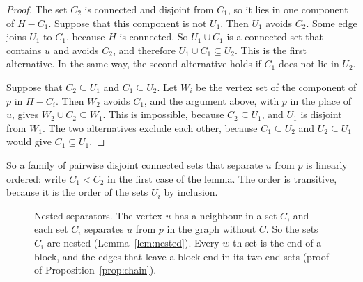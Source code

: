 \begin{proof}
The set $C_2$ is connected and disjoint from $C_1$, so it lies in one component of $H-C_1$.
Suppose that this component is not $U_1$. Then $U_1$ avoids $C_2$. Some edge joins $U_1$ to
$C_1$, because $H$ is connected. So $U_1\cup C_1$ is a connected set that contains $u$ and avoids
$C_2$, and therefore $U_1\cup C_1\subseteq U_2$. This is the first alternative. In the same way,
the second alternative holds if $C_1$ does not lie in $U_2$.

Suppose that $C_2\subseteq U_1$ and $C_1\subseteq U_2$. Let $W_i$ be the vertex set of the
component of $p$ in $H-C_i$. Then $W_2$ avoids $C_1$, and the argument above, with $p$ in the
place of $u$, gives $W_2\cup C_2\subseteq W_1$. This is impossible, because $C_2\subseteq U_1$,
and $U_1$ is disjoint from $W_1$. The two alternatives exclude each other, because
$C_1\subseteq U_2$ and $U_2\subseteq U_1$ would give $C_1\subseteq U_1$.
\end{proof}

So a family of pairwise disjoint connected sets that separate $u$ from $p$ is linearly ordered:
write $C_1<C_2$ in the first case of the lemma. The order is transitive, because it is the order
of the sets $U_i$ by inclusion.

\begin{figure}[ht]
\centering
{}
\caption{Nested separators. The vertex $u$ has a neighbour in a set $C$, and each set $C_i$
separates $u$ from $p$ in the graph without $C$. So the sets $C_i$ are nested
(Lemma~\ref{lem:nested}). Every $w$-th set is the end of a block, and the edges that leave a
block end in its two end sets (proof of Proposition~\ref{prop:chain}).}
\label{fig:chain}
\end{figure}

